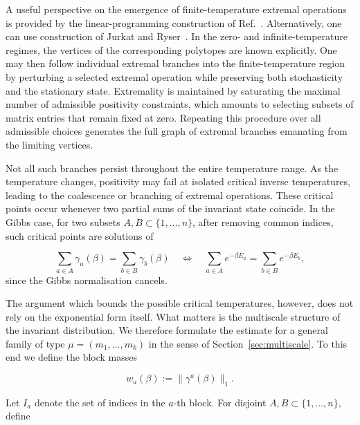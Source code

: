 \documentclass[11pt,a4paper,longbibliography]{amsart}
\numberwithin{equation}{section}
\theoremstyle{plain}
\theoremstyle{definition}
\theoremstyle{remark}
\begin{document}
		A useful perspective on the emergence of finite-temperature extremal operations is provided by the linear-programming construction of Ref.~\cite{mazurek2018decomposability}. Alternatively, one can use construction of Jurkat and Ryser~\cite{Jurkat1967}. In the zero- and infinite-temperature regimes, the vertices of the corresponding polytopes are known explicitly. One may then follow individual extremal branches into the finite-temperature region by perturbing a selected extremal operation while preserving both stochasticity and the stationary state. Extremality is maintained by saturating the maximal number of admissible positivity constraints, which amounts to selecting subsets of matrix entries that remain fixed at zero. Repeating this procedure over all admissible choices generates the full graph of extremal branches emanating from the limiting vertices. 
		
		Not all such branches persist throughout the entire temperature range. As the temperature changes, positivity may fail at isolated critical inverse temperatures, leading to the coalescence or branching of extremal operations. These critical points occur whenever
		two partial sums of the invariant state coincide. In the Gibbs case, for two subsets $A,B\subset\{1,\ldots,n\}$, after removing common indices, such critical points are solutions of 
		
		\begin{equation}
			\sum_{a\in A}\gamma_a(\beta) = \sum_{b\in B}\gamma_b(\beta) \quad\Longleftrightarrow\quad
			\sum_{a\in A}e^{-\beta E_a} = \sum_{b\in B}e^{-\beta E_b}, 
		\end{equation}
		since the Gibbs normalisation cancels. 
		
		The argument which bounds the possible critical temperatures, however, does not rely on the exponential form itself. What matters is the multiscale structure of the invariant distribution. We therefore formulate the estimate for a general family of type $\mu=(m_1,\ldots,m_k)$ in the sense of Section~\ref{sec:multiscale}. To this end we define the block masses 
		
		\begin{equation}
			w_a(\beta):=\|\gamma^a(\beta)\|_1 . 
		\end{equation}
		
		Let $I_a$ denote the set of indices in the $a$-th block. For disjoint $A,B\subset\{1,\ldots,n\}$, define 
		
\end{document}
